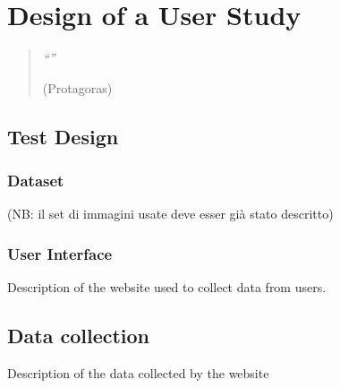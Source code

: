 \chapter{Design of a User Study}
\label{chapter5}
\thispagestyle{empty}

\begin{quotation}
{\footnotesize
\noindent \emph{``''}
\begin{flushright}
 (Protagoras) 
\end{flushright}
}
\end{quotation}

\vspace{0.5cm}


\section{Test Design}

\subsection{Dataset}

(NB: il set di immagini usate deve esser già stato descritto)

\subsection{User Interface}

Description of the website used to collect data from users.

\vspace{0.5cm}

\section{Data collection}

Description of the data collected by the website